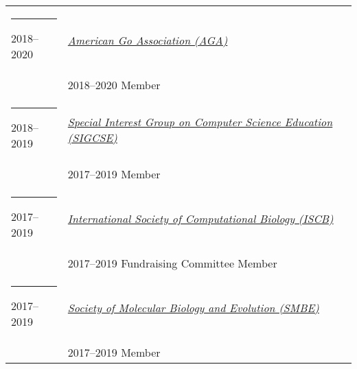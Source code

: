 \documentclass[margin,line]{res}
\begin{document}
\begin{resume}
\begin{longtable}{@{}p{0.7in}p{4in}}
\hspace*{-4mm} \rule{-1mm}{5mm} 2018--2020 & \href{http://www.usgo.org/}{\textit{American Go Association (AGA)}}\\*
\hspace*{-4mm} & \hspace{4mm} 2018--2020 Member\\
\hspace*{-4mm} \rule{-1mm}{5mm} 2018--2019 & \href{https://sigcse.org/}{\textit{Special Interest Group on Computer Science Education (SIGCSE)}}\\*
\hspace*{-4mm} & \hspace{4mm} 2017--2019 Member\\
\hspace*{-4mm} \rule{-1mm}{5mm} 2017--2019 & \href{https://www.iscb.org/}{\textit{International Society of Computational Biology (ISCB)}}\\*
\hspace*{-4mm} & \hspace{4mm} 2017--2019 Fundraising Committee Member\\
\hspace*{-4mm} \rule{-1mm}{5mm} 2017--2019 & \href{http://www.smbe.org/}{\textit{Society of Molecular Biology and Evolution (SMBE)}}\\*
\hspace*{-4mm} & \hspace{4mm} 2017--2019 Member\\
\end{longtable}


\end{resume}
\end{document}
